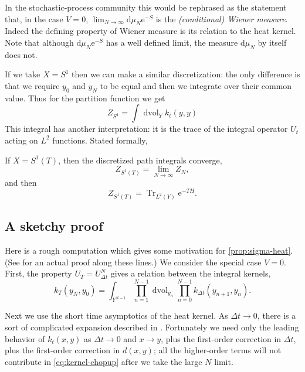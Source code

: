 \documentclass[12pt,letterpaper,reqno]{article}
\numberwithin{equation}{section}
\newcommand{\e}{{\mathrm e}}
\newcommand{\de}{\mathrm{d}}
\newcommand{\ti}[1]{\textit{#1}}
\DeclareMathOperator{\dvol}{dvol}
\DeclareMathOperator{\Tr}{Tr}
\begin{document}
In the stochastic-process community this would be rephrased
as the statement that, in the case $V = 0$, 
$\lim_{N \to \infty} \de \mu_N \e^{-S}$ is the
\ti{(conditional) Wiener measure}. Indeed the defining
property of Wiener measure is its relation to the heat 
kernel. Note that although $\de \mu_N \e^{-S}$ 
has a well defined
limit, the measure $\de \mu_N$ by itself does not.

If we take $X = S^1$ then we can make a similar 
discretization: the only difference is that we require
$y_0$ and $y_N$ to be equal and then we integrate over their
common value. Thus for the partition function we get
\begin{equation}
Z_{S^1} = \int \dvol_Y k_t(y,y)
\end{equation}
This integral has another interpretation: it is the trace
of the integral operator $U_t$ acting on $L^2$ functions.
Stated formally,
\begin{prop}
If $X = S^1(T)$, then the discretized path integrals converge,
\begin{equation}
  Z_{S^1(T)} = \lim_{N \to \infty} Z_N,
\end{equation}
and then
\begin{equation}
  Z_{S^1(T)} = \Tr_{L^2(Y)} \e^{-T H}.
\end{equation}
\end{prop}


\subsection{A sketchy proof}

Here is a rough computation which gives some
motivation for \autoref{prop:sigma-heat}.
(See \cite{Baer2007} for an actual proof along these lines.)
We consider the special case $V = 0$.
First, the property $U_T = U_{\Delta t}^N$ gives a 
relation between the integral kernels,
\begin{equation} \label{eq:kernel-chopup}
  k_T(y_N, y_0) = \int_{Y^{N-1}} \prod_{n=1}^{N-1} \dvol_{y_n} \prod_{n=0}^{N-1} k_{\Delta t} (y_{n+1}, y_n).
\end{equation}

Next we use the short time asymptotics of
the heat kernel. As $\Delta t \to 0$, there is a sort of complicated
expansion described in \cite{Berline2004}. Fortunately we need only the leading behavior
of $k_t(x,y)$ as $\Delta t \to 0$ and $x \to y$,
plus the first-order correction in $\Delta t$, plus the first-order correction
in $d(x,y)$; all the higher-order terms will not contribute 
in \eqref{eq:kernel-chopup} after we take the large $N$ limit.
\end{document}
